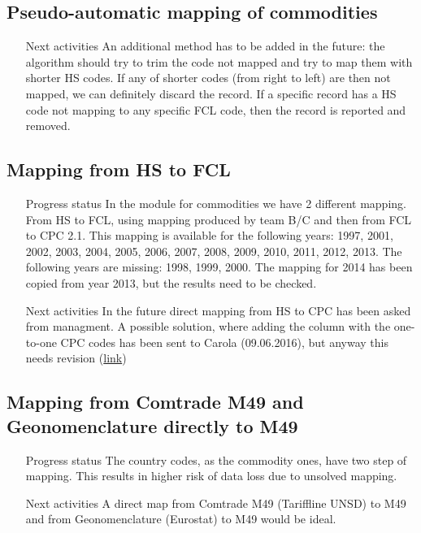 \documentclass[nojss]{jss}\usepackage[]{graphicx}\usepackage[]{color}
\begin{document}
\subsection{Pseudo-automatic mapping of commodities}
\begin{itemize}
\item[Next activities] An additional method has to be added in the future: the algorithm should try to trim the code not mapped and try to map them with shorter HS codes. If any of shorter codes (from right to left) are then not mapped, we can definitely discard the record.
If a specific record has a HS code not mapping to any specific FCL code, then the record is reported and removed.
\end{itemize}

\subsection{Mapping from HS to FCL}
\begin{itemize}
\item[Progress status] In the module for commodities we have 2 different mapping. From HS to FCL, using mapping produced by team B/C and then from FCL to CPC 2.1. This mapping is available for the following years: 1997, 2001, 2002, 2003, 2004, 2005, 2006, 2007, 2008, 2009, 2010, 2011, 2012, 2013. The following years are missing: 1998, 1999, 2000. The mapping for 2014 has been copied from year 2013, but the results need to be checked.
\item[Next activities] In the future direct mapping from HS to CPC has been asked from managment. A possible solution, where adding the column with the one-to-one CPC codes has been sent to Carola (09.06.2016), but anyway this needs revision (\href{https://drive.google.com/drive/folders/0B_Z6srBtmyJRUmtaaXphTllZUDA}{link})
\end{itemize}

\subsection{Mapping from Comtrade M49 and Geonomenclature directly to M49}
\begin{itemize}
\item[Progress status] The country codes, as the commodity ones, have two step of mapping. This results in higher risk of data loss due to unsolved mapping.
\item[Next activities] A direct map from Comtrade M49 (Tariffline UNSD) to M49 and from Geonomenclature (Eurostat) to M49 would be ideal.
\end{itemize}
\end{document}
